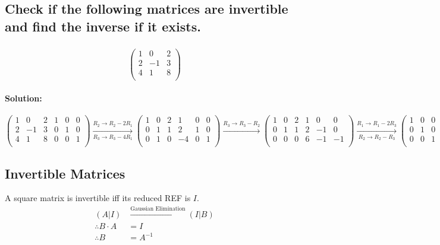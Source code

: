 \documentclass[fleqn]{article}
\begin{document}
\subsection{Check if the following matrices are invertible and find the inverse if it exists.}

\subsubsection{}

\begin{equation*}
	\begin{pmatrix*}
		1 & 0 & 2\\
		2 & -1 & 3\\
		4 & 1 & 8\\
	\end{pmatrix*}
\end{equation*}

\paragraph{Solution:\\}

$
\begin{pmatrix}
	1 & 0 & 2 & 1 & 0 & 0\\
	2 & -1 & 3 & 0 & 1 & 0\\
	4 & 1 & 8 & 0 & 0 & 1\\
\end{pmatrix}
\xrightarrow[R_3 \rightarrow R_3 - 4 R_1]{R_2 \rightarrow R_2 - 2 R_1}
\begin{pmatrix}
	1 & 0 & 2 & 1 & 0 & 0\\
	0 & 1 & 1 & 2 & 1 & 0\\
	0 & 1 & 0 & -4 & 0 & 1\\
\end{pmatrix}
\xrightarrow{R_3 \rightarrow R_3 - R_2}
\begin{pmatrix}
	1 & 0 & 2 & 1 & 0 & 0\\
	0 & 1 & 1 & 2 & -1 & 0\\
	0 & 0 & 0 & 6 & -1 & -1\\
\end{pmatrix}
\xrightarrow[R_2 \rightarrow R_2 - R_3]{R_1 \rightarrow R_1 - 2 R_3}
\begin{pmatrix}
	1 & 0 & 0 & -11 & 2 & 2\\
	0 & 1 & 0 & -4 & 0 & 1\\
	0 & 0 & 1 & 6 & -1 & -1\\
\end{pmatrix}
$

\subsection{Invertible Matrices}

A square matrix is invertible iff its reduced REF is $I$.\\
\begin{align*}
	(A|I) &\xrightarrow{\text{Gaussian Elimination}} (I|B)\\
	\therefore B \cdot A &= I \\
	\therefore B & = A^{-1}
\end{align*}
\end{document}
